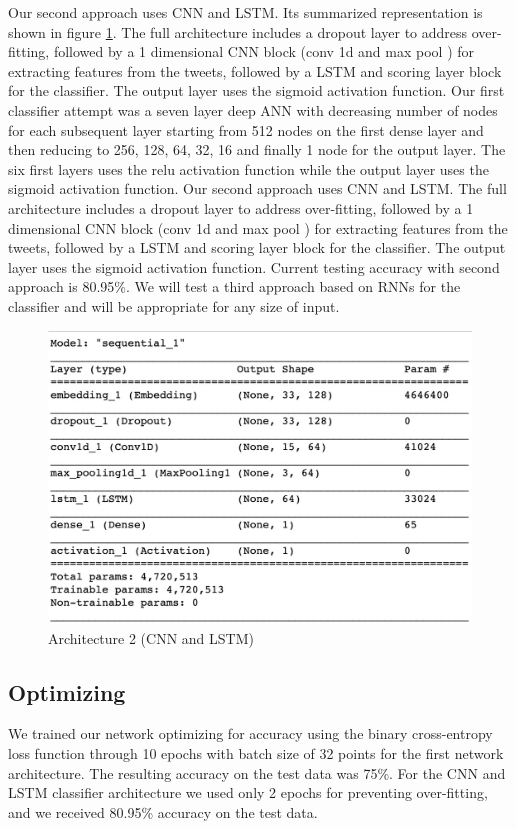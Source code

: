 \documentclass[conference]{sig-alternate-05-2015}
\begin{document}
Our second approach uses CNN and LSTM. Its summarized representation is shown in figure \ref{fig:model CNN LSTM}. The full architecture includes a dropout layer to address over-fitting, followed by a 1 dimensional CNN block (conv 1d and max pool ) for extracting features from the tweets, followed by a LSTM and scoring layer block for the classifier. The output layer uses the sigmoid activation function.
Our first classifier attempt was a seven layer deep ANN with decreasing number of nodes for each subsequent layer starting from 512 nodes on the first dense layer and then reducing to 256, 128, 64, 32, 16 and finally 1 node for the output layer. The six first layers uses the relu activation function while the output layer uses the sigmoid activation function.
Our second approach uses CNN and LSTM. The full architecture includes a dropout layer to address over-fitting, followed by a 1 dimensional CNN block (conv 1d and max pool ) for extracting features from the tweets, followed by a LSTM and scoring layer block for the classifier. The output layer uses the sigmoid activation function. Current testing accuracy with second approach is 80.95\%.
We will test a third approach based on RNNs for the classifier and will be appropriate for any size of input.
\begin{figure}
	\centering
	\includegraphics[width=0.8\linewidth]{"model CNN LSTM"}
	\caption{Architecture 2 (CNN and LSTM)}
	\label{fig:model CNN LSTM}
\end{figure}

\subsection{Optimizing}
We trained our network optimizing for accuracy using the binary cross-entropy loss function through 10 epochs with batch size of 32 points for the first network architecture. The resulting accuracy on the test data was 75\%. For the CNN and LSTM classifier architecture we used only 2 epochs for preventing over-fitting, and we received 80.95\% accuracy on the test data.
\end{document}
